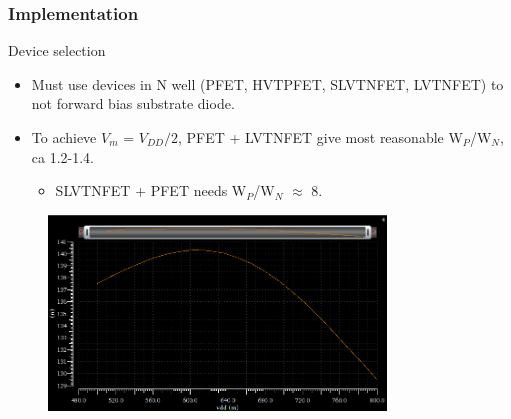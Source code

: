 \documentclass[t, screen, aspectratio=43]{beamer}
\begin{document}
\begin{frame}
	\frametitle{Implementation}
	\begin{block}{Device selection}
		\vspace{1em}
		\begin{minipage}{6cm}
			\tiny

			\begin{itemize}[itemsep=4pt,label=\protect---]
				\item Must use devices in N well (PFET, HVTPFET, SLVTNFET, LVTNFET) to not forward bias substrate diode.
				\item To achieve $V_{m}$ =  $V_{DD}/2$, PFET + LVTNFET give most reasonable W$_P$/W$_N$, ca 1.2-1.4.
				\begin{itemize}[itemsep=4pt,label=$\bullet$]
					\item SLVTNFET + PFET needs W$_P$/W$_N$ $\approx$ 8.
				\end{itemize}
			\end{itemize}
		\end{minipage}%
		\begin{minipage}{6cm}
			\begin{figure}[htb!]
			        \centering
			        \includegraphics[width=0.8\textwidth, angle=0]{wp_pfet_lvtnfet_inv}
			\end{figure}

		\end{minipage}%

	\end{block}	

\end{frame}
\end{document}
